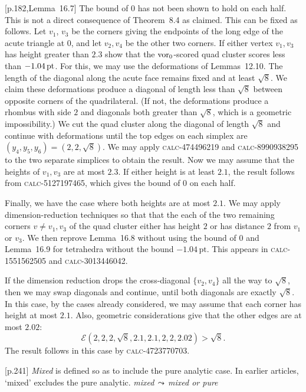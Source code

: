 \documentclass[11pt]{amsart}
\def\op#1{{\text{#1}}}
\def\lto{\ensuremath{\,\leadsto\,}}
\def\text{\hbox}
\def\sz{small} %
\def\rmx{\rm}
\def\calc#1{{\textsc{calc-#1}}}
\def\pt{\mathrm{pt}}
\begin{document}
\begin{\sz}
	
[p.182,Lemma~16.7]  {\rmx The bound of $0$ has not been
shown to hold on each half.  This is not a 
direct consequence
of Theorem~8.4 as claimed.
This can be fixed as follows. 
Let $v_1$, $v_3$ be the corners giving the endpoints of the long edge of the
acute triangle at $0$, and let $v_2,v_4$ be the other two corners.
If either vertex $v_1,v_3$ 
has height greater than $2.3$ show that the $\op{vor}_0$-scored quad cluster scores
less than $-1.04\,\op{pt}$.  
For this, we may use the deformations of Lemmas~12.10.  The length of the diagonal along the acute face remains fixed and at least $\sqrt8$.  We claim these deformations produce a diagonal of length less than $\sqrt8$ between opposite corners of the quadrilateral.  (If not, the deformations produce a rhombus with side $2$ and diagonals both greater than $\sqrt8$, which is a geometric impossibility.)  We cut the quad cluster along the diagonal of length $\sqrt8$ and continue with deformations until the top edges on each simplex are $(y_4,y_5,y_6)=(2,2,\sqrt8)$.  We may apply \calc{474496219} and \calc{8990938295} to the two separate simplices to obtain the result.}
%
%
Now we may assume that the heights of $v_1,v_3$ are at most $2.3$.  If either
height is at least $2.1$, the result follows from \calc{5127197465}, which gives
the bound of $0$ on each half.

Finally, we have the case where both heights are at most $2.1$.  We may apply
dimension-reduction techniques so that that the each of the two
remaining corners $v\ne v_1,v_3$
of the quad cluster either has height $2$ or has distance $2$ from $v_1$ or $v_3$.
We then reprove Lemma~16.8 without using the bound of $0$ and Lemma~16.9 for tetrahedra without the bound  $-1.04\,\pt$.  This appears in \calc{1551562505} and \calc{3013446042}.  

If the dimension reduction drops the cross-diagonal $\{v_2,v_4\}$ all the way to $\sqrt8$, then we may swap diagonals and continue, until both diagonals are exactly $\sqrt8$.  In this case, by the cases already considered, we may assume that each corner has height at most $2.1$.  Also, geometric considerations give that the other edges are at most $2.02$:
  $$
  {\mathcal E}(2,2,2,\sqrt8,2.1,2.1,2,2,2.02) >\sqrt8.
  $$
The result follows in this case by \calc{4723770703}.


%





[p.241]  {\rmx {\it Mixed} is defined so as to include
the pure analytic case.  In earlier articles,
`mixed' excludes the pure analytic.  }
	{\it mixed\lto mixed or pure}
	

\end{\sz}
\end{document}
